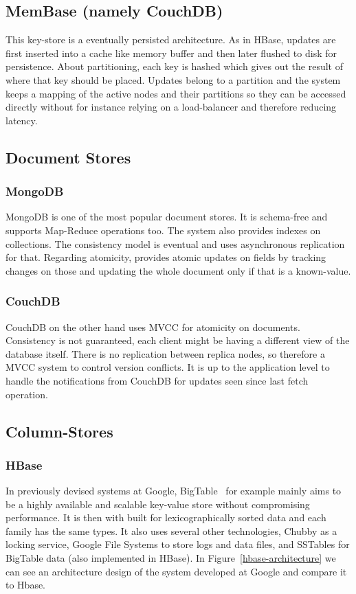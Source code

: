 	\subsection{MemBase (namely CouchDB)}
	This key-store is a eventually persisted architecture. As in HBase, updates are first inserted into a cache like memory buffer and then later flushed to disk for persistence. About partitioning, each key is hashed which gives out the result of where that key should be placed. Updates belong to a partition and the system keeps a mapping of the active nodes and their partitions so they can be accessed directly without for instance relying on a load-balancer and therefore reducing latency.

\subsection{Document Stores}
	\subsubsection{MongoDB}
	MongoDB is one of the most popular document stores. It is schema-free and supports Map-Reduce operations too. The system also provides indexes on collections. The consistency model is eventual and uses asynchronous replication for that. Regarding atomicity, provides atomic updates on fields by tracking changes on those and updating the whole document only if that is a known-value.
	
	\subsubsection{CouchDB}
	CouchDB on the other hand uses MVCC for atomicity on documents. Consistency is not guaranteed, each client might be having a different view of the database itself. There is no replication between replica nodes, so therefore a MVCC system to control version conflicts. It is up to the application level to handle the notifications from CouchDB for updates seen since last fetch operation.
	

\subsection{Column-Stores}
	\subsubsection{HBase}
	In previously devised systems at Google, BigTable~\cite{Chang:2006} for example mainly aims to be a highly available and scalable key-value store without compromising performance. It is then with built for lexicographically sorted data and each family has the same types. It also uses several other technologies, Chubby as a locking service, Google File Systems to store logs and data files, and SSTables for BigTable data (also implemented in HBase). In Figure~\ref{hbase-architecture} we can see an architecture design of the system developed at Google and compare it to Hbase.

